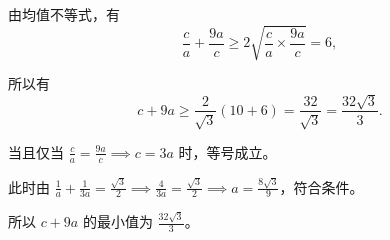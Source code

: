 {  由均值不等式，有
  \[ \frac{c}{a} + \frac{9a}{c} \ge 2\sqrt{\frac{c}{a} \times \frac{9a}{c}} = 6, \]
  
  所以有
  \[ c + 9a \ge \frac{2}{\sqrt{3}}(10 + 6) = \frac{32}{\sqrt{3}} = \frac{32\sqrt{3}}{3}. \]
  
  当且仅当 $\frac{c}{a} = \frac{9a}{c} \implies c = 3a$ 时，等号成立。
  
  此时由 $\frac{1}{a} + \frac{1}{3a} = \frac{\sqrt{3}}{2} \implies \frac{4}{3a} = \frac{\sqrt{3}}{2} \implies a = \frac{8\sqrt{3}}{9}$，符合条件。
  
  所以 $c + 9a$ 的最小值为 $\frac{32\sqrt{3}}{3}$。
}

\newcommand{\qTriangleBisectorMinDiagnosis}{%
  学生第 (1) 问能用角平分线定理并得到正确比值；第 (2) 问中断，说明边角条件转化和最值链条尚未成型。关键缺口是由正弦定理推出 \(B=\frac{\pi}{3}\)，再由角平分线长度关系得到 \(\frac1a+\frac1c=\frac{\sqrt3}{2}\)，最后用均值不等式求最小值。%
}

\newcommand{\qTriangleBisectorMinTeachingNotes}{%
  精讲。课堂强调“边角化 -> 定角 -> 角平分线长度/面积关系 -> 倒数约束 -> 基本不等式”的完整链条。%
}


\newcommand{\qLYBZeroOneSixteenStem}{\qTriangleBisectorMinStem}
\newcommand{\qLYBZeroOneSixteenFigure}[1][1.2]{\qTriangleBisectorMinFigure[#1]}
\newcommand{\qLYBZeroOneSixteenAnswer}{\qTriangleBisectorMinAnswer}
\newcommand{\qLYBZeroOneSixteenSolution}{\qTriangleBisectorMinSolution}
\newcommand{\qLYBZeroOneSixteenDiagnosis}{\qTriangleBisectorMinDiagnosis}
\newcommand{\qLYBZeroOneSixteenTeachingNotes}{\qTriangleBisectorMinTeachingNotes}
